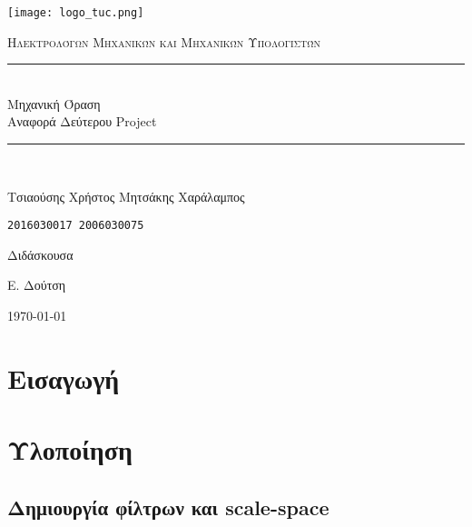 \documentclass[11pt]{scrartcl} %
\begin{document}
\begin{titlepage}
    \centering
    \texttt{[image: logo\_tuc.png]}\par\vspace{1cm}
    \normalfont\normalsize
    \textsc{\textcolor[rgb]{0.66, 0.09, 0.19}{Ηλεκτρολόγων Μηχανικών και Μηχανικών Υπολογιστών}}\\ %
    \vspace{25pt} %
    \rule{\linewidth}{0.5pt}\\ %
    \vspace{20pt} %
    {\Huge Μηχανική Όραση}\\ %

    {\huge Αναφορά Δεύτερου Project}\\ %
    \vspace{12pt} %
    \rule{\linewidth}{2pt}\\ %
    \vspace{12pt} %
    \vspace{2cm}

    {\LARGE{Τσιαούσης Χρήστος \hfill Μητσάκης Χαράλαμπος}
        \par
        \texttt{2016030017 \hfill 2006030075}
        \par
    }

    \vfill
    Διδάσκουσα

    Ε. Δούτση

    \vfill

    {\large \today\par}
\end{titlepage}

\newpage


\section{Εισαγωγή}

\section{Υλοποίηση}

\subsection{Δημιουργία φίλτρων και scale-space}
\end{document}

